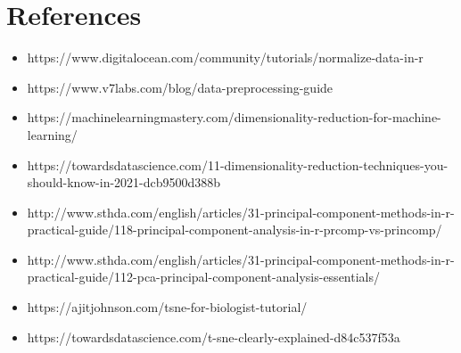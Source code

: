 \documentclass[11pt]{article}
\providecommand{\tightlist}{%
      \setlength{\itemsep}{0pt}\setlength{\parskip}{0pt}}
\begin{document}
    \hypertarget{references}{%
\section{References}\label{references}}

\begin{itemize}
\tightlist
\item
  https://www.digitalocean.com/community/tutorials/normalize-data-in-r
\item
  https://www.v7labs.com/blog/data-preprocessing-guide
\item
  https://machinelearningmastery.com/dimensionality-reduction-for-machine-learning/
\item
  https://towardsdatascience.com/11-dimensionality-reduction-techniques-you-should-know-in-2021-dcb9500d388b
\item
  http://www.sthda.com/english/articles/31-principal-component-methods-in-r-practical-guide/118-principal-component-analysis-in-r-prcomp-vs-princomp/
\item
  http://www.sthda.com/english/articles/31-principal-component-methods-in-r-practical-guide/112-pca-principal-component-analysis-essentials/
\item
  https://ajitjohnson.com/tsne-for-biologist-tutorial/
\item
  https://towardsdatascience.com/t-sne-clearly-explained-d84c537f53a
\end{itemize}


    
    
    
\end{document}
